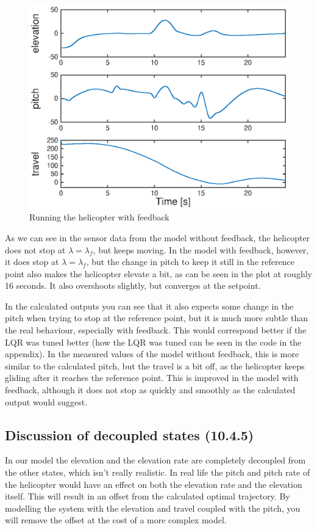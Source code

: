\begin{figure}[H]
	\centering
	\includegraphics[width=\textwidth]{day4_yesfeed}
	\caption{Running the helicopter with feedback}
	\label{fig:day4yesfeed}
\end{figure}

As we can see in the sensor data from the model without feedback, the helicopter does not stop at $\lambda = \lambda_f$, but keeps moving. In the model with feedback, however, it does stop at $\lambda = \lambda_f$, but the change in pitch to keep it still in the reference point also makes the helicopter elevate a bit, as can be seen in the plot at roughly 16 seconds. It also overshoots slightly, but converges at the setpoint.

In the calculated outputs you can see that it also expects some change in the pitch when trying to stop at the reference point, but it is much more subtle than the real behaviour, especially with feedback. This would correspond better if the LQR was tuned better (how the LQR was tuned can be seen in the code in the appendix). In the measured values of the model without feedback, this is more similar to the calculated pitch, but the travel is a bit off, as the helicopter keeps gliding after it reaches the reference point. This is improved in the model with feedback, although it does not stop as quickly and smoothly as the calculated output would suggest.

\subsection{Discussion of decoupled states (10.4.5)}
In our model the elevation and the elevation rate are completely decoupled from the other states, which isn't really realistic. In real life the pitch and pitch rate of the helicopter would have an effect on both the elevation rate and the elevation itself. This will result in an offset from the calculated optimal trajectory.  
By modelling the system with the elevation and travel coupled with the pitch, you will remove the offset at the cost of a more complex model.